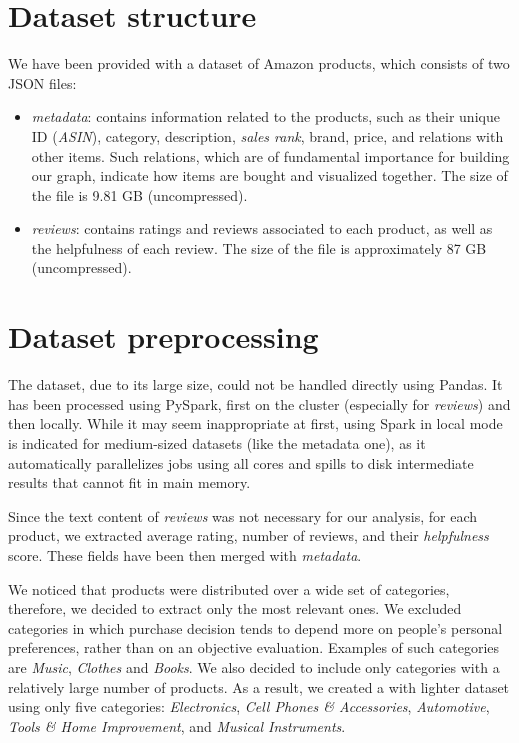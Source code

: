 \documentclass[11pt]{article}
\begin{document}
\section{Dataset structure}
\label{sec:datastruct}
We have been provided with a dataset of Amazon products, which consists of two JSON files: 
\begin{itemize}
	\item \textit{metadata}: contains information related to the products, such as their unique ID (\textit{ASIN}), category, description, \textit{sales rank}, brand, price, and relations with other items. Such relations, which are of fundamental importance for building our graph, indicate how items are bought and visualized together. The size of the file is 9.81 GB (uncompressed).
	\item \textit{reviews}: contains ratings and reviews associated to each product, as well as the helpfulness of each review. The size of the file is approximately 87 GB (uncompressed).
\end{itemize}

\section{Dataset preprocessing}
\label{sec:datapreprocessing}
The dataset, due to its large size, could not be handled directly using Pandas. It has been processed using PySpark, first on the cluster (especially for \textit{reviews}) and then locally. While it may seem inappropriate at first, using Spark in local mode is indicated for medium-sized datasets (like the metadata one), as it automatically parallelizes jobs using all cores and spills to disk intermediate results that cannot fit in main memory. 

Since the text content of \textit{reviews} was not necessary for our  analysis, for each product, we extracted average rating, number of reviews, and their \textit{helpfulness} score. These fields have been then merged with \textit{metadata}.

We noticed that products were distributed over a wide set of categories, therefore, we decided to extract only the most relevant ones. We excluded categories in which purchase decision tends to depend more on people's personal preferences, rather than on an objective evaluation. Examples of such categories are \textit{Music}, \textit{Clothes} and \textit{Books}. We also decided to include only categories with a relatively large number of products. As a result, we created a with lighter dataset using only five categories:  \textit{Electronics}, \textit{Cell Phones \& Accessories}, \textit{Automotive}, \textit{Tools \& Home Improvement}, and \textit{Musical Instruments}. 
\end{document}
